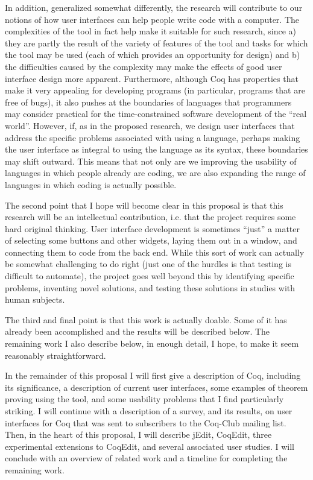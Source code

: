 \documentclass[11pt]{amsart}
\begin{document}
In addition, generalized somewhat differently, the research will contribute to our notions of how user interfaces can help people write code with a computer.  The complexities of the tool in fact help make it suitable for such research, since a) they are partly the result of the variety of features of the tool and tasks for which the tool may be used (each of which provides an opportunity for design) and b) the difficulties caused by the complexity may make the effects of good user interface design more apparent.  Furthermore, although Coq has properties that make it very appealing for developing programs (in particular, programs that are free of bugs), it also pushes at the boundaries of languages that programmers may consider practical for the time-constrained software development of the ``real world''.  However, if, as in the proposed research, we design user interfaces that address the specific problems associated with using a language, perhaps making the user interface as integral to using the language as its syntax, these boundaries may shift outward.  This means that not only are we improving the usability of languages in which people already are coding, we are also expanding the range of languages in which coding is actually possible.

The second point that I hope will become clear in this proposal is that this research will be an intellectual contribution, i.e. that the project requires some hard original thinking.  User interface development is sometimes ``just'' a matter of selecting some buttons and other widgets, laying them out in a window, and connecting them to code from the back end.  While this sort of work can actually be somewhat challenging to do right (just one of the hurdles is that testing is difficult to automate), the project goes well beyond this by identifying specific problems, inventing novel solutions, and testing these solutions in studies with human subjects.

The third and final point is that this work is actually doable.  Some of it has already been accomplished and the results will be described below.  The remaining work I also describe below, in enough detail, I hope, to make it seem reasonably straightforward. 

In the remainder of this proposal I will first give a description of Coq, including its significance, a description of current user interfaces, some examples of theorem proving using the tool, and some usability problems that I find particularly striking.  I will continue with a description of a survey, and its results, on user interfaces for Coq that was sent to subscribers to the Coq-Club mailing list.    Then, in the heart of this proposal, I will describe jEdit, CoqEdit, three experimental extensions to CoqEdit, and several associated user studies.  I will conclude with an overview of related work and a timeline for completing the remaining work.
\end{document}
